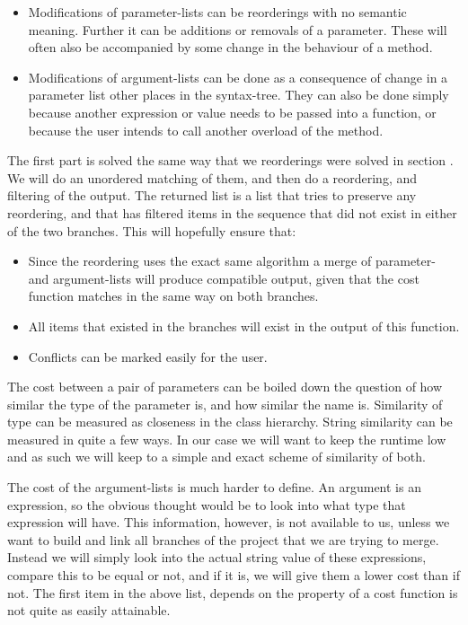 \documentclass[11pt]{article}
\begin{document}
\begin{itemize}
   \item Modifications of parameter-lists can be reorderings with no semantic meaning. Further it can be additions or removals of a parameter. These will often also be accompanied by some change in the behaviour of a method.
   \item Modifications of argument-lists can be done as a consequence of change in a parameter list other places in the syntax-tree. They can also be done simply because another expression or value needs to be passed into a function, or because the user intends to call another overload of the method.
\end{itemize}

The first part is solved the same way that we reorderings were solved in section . We will do an unordered matching of them, and then do a reordering, and filtering of the output. The returned list is a list that tries to preserve any reordering, and that has filtered items in the sequence that did not exist in either of the two branches. This will hopefully ensure that:

\begin{itemize}
   \item Since the reordering uses the exact same algorithm a merge of parameter- and argument-lists will produce compatible output, given that the cost function matches in the same way on both branches.
   \item All items that existed in the branches will exist in the output of this function. 
   \item Conflicts can be marked easily for the user.
\end{itemize}

The cost between a pair of parameters can be boiled down the question of how similar the type of the parameter is, and how similar the name is. Similarity of type can be measured as closeness in the class hierarchy. String similarity can be measured in quite a few ways. In our case we will want to keep the runtime low and as such we will keep to a simple and exact scheme of similarity of both.

The cost of the argument-lists is much harder to define. An argument is an expression, so the obvious thought would be to look into what type that expression will have. This information, however, is not available to us, unless we want to build and link all branches of the project that we are trying to merge. Instead we will simply look into the actual string value of these expressions, compare this to be equal or not, and if it is, we will give them a lower cost than if not.
The first item in the above list, depends on the property of a cost function is not quite as easily attainable. 
\end{document}
